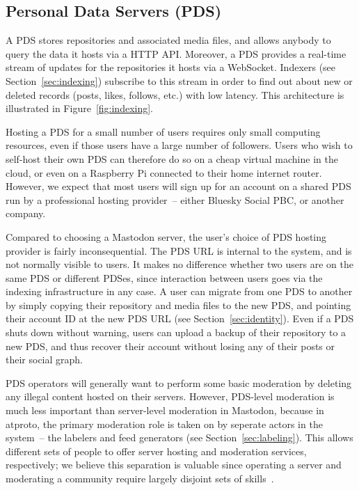 \documentclass[sigconf,nonacm]{acmart}
\begin{document}
\subsection{Personal Data Servers (PDS)}\label{sec:pds}

A PDS stores repositories and associated media files, and allows anybody to query the data it hosts via a HTTP API.
Moreover, a PDS provides a real-time stream of updates for the repositories it hosts via a WebSocket.
Indexers (see Section~\ref{sec:indexing}) subscribe to this stream in order to find out about new or deleted records (posts, likes, follows, etc.) with low latency.
This architecture is illustrated in Figure~\ref{fig:indexing}.

Hosting a PDS for a small number of users requires only small computing resources, even if those users have a large number of followers.
Users who wish to self-host their own PDS can therefore do so on a cheap virtual machine in the cloud, or even on a Raspberry Pi connected to their home internet router.
However, we expect that most users will sign up for an account on a shared PDS run by a professional hosting provider~-- either Bluesky Social PBC, or another company.

Compared to choosing a Mastodon server, the user's choice of PDS hosting provider is fairly inconsequential.
The PDS URL is internal to the system, and is not normally visible to users.
It makes no difference whether two users are on the same PDS or different PDSes, since interaction between users goes via the indexing infrastructure in any case.
A user can migrate from one PDS to another by simply copying their repository and media files to the new PDS, and pointing their account ID at the new PDS URL (see Section~\ref{sec:identity}).
Even if a PDS shuts down without warning, users can upload a backup of their repository to a new PDS, and thus recover their account without losing any of their posts or their social graph.

PDS operators will generally want to perform some basic moderation by deleting any illegal content hosted on their servers.
However, PDS-level moderation is much less important than server-level moderation in Mastodon, because in atproto, the primary moderation role is taken on by seperate actors in the system~-- the labelers and feed generators (see Section~\ref{sec:labeling}).
This allows different sets of people to offer server hosting and moderation services, respectively; we believe this separation is valuable since operating a server and moderating a community require largely disjoint sets of skills~\cite{Roth:2023}.
\end{document}
